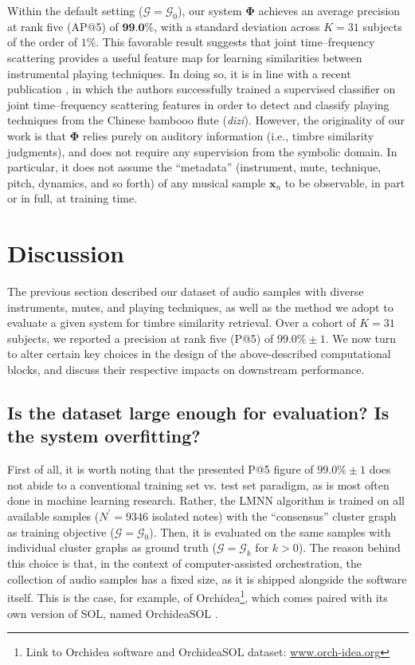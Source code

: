 \documentclass{bmcart}
\newcommand{\nmu}{}
\begin{document}
Within the default setting ($\mathcal{G}=\mathcal{G}_0$), our system $\mathbf{\Phi}$ achieves an average precision at rank five (AP@5) of $\textbf{99.0\%}$, with a standard deviation across $K=31$ subjects of the order of $1\%$.
This favorable result suggests that joint time--frequency scattering provides a useful feature map for learning similarities between instrumental playing techniques.
In doing so, it is in line with a recent publication \cite{wang2020icassp}, in which the authors successfully trained a supervised classifier on joint time--frequency scattering features in order to detect and classify playing techniques from the Chinese bambooo flute (\emph{dizi}).
However, the originality of our work is that $\mathbf{\Phi}$ relies purely on auditory information (i.e., timbre similarity judgments), and does not require any supervision from the symbolic domain.
In particular, it does not assume the ``metadata'' (instrument, mute, technique, pitch, dynamics, and so forth) of any musical sample $\boldsymbol{x}_n$ to be observable, in part or in full, at training time.



\section*{\nmu Discussion}
\label{sec:discussion}

The previous section described our dataset of audio samples with diverse instruments, mutes, and playing techniques, as well as the method we adopt to evaluate a given system for timbre similarity retrieval.
Over a cohort of $K=31$ subjects, we reported a precision at rank five (P@5) of $99.0\% \pm 1$.
We now turn to alter certain key choices in the design of the above-described computational blocks, and discuss their respective impacts on downstream performance.


\subsection*{Is the dataset large enough for evaluation? Is the system overfitting?}
First of all, it is worth noting that the presented P@5 figure of $99.0\% \pm 1$ does not abide to a conventional training set vs. test set paradigm, as is most often done in machine learning research.
Rather, the LMNN algorithm is trained on all available samples ($N^{\prime}=9346$ isolated notes) with the ``consensus'' cluster graph as training objective ($\mathcal{G}=\mathcal{G}_0$).
Then, it is evaluated on the same samples with individual cluster graphs as ground truth ($\mathcal{G}=\mathcal{G}_k$ for $k>0$).
The reason behind this choice is that, in the context of computer-assisted orchestration, the collection of audio samples has a fixed size, as it is shipped alongside the software itself.
This is the case, for example, of Orchidea\footnote{Link to Orchidea software and OrchideaSOL dataset: \url{www.orch-idea.org}}, which comes paired with its own version of SOL, named OrchideaSOL \cite{cella2020icmc}.
\end{document}
